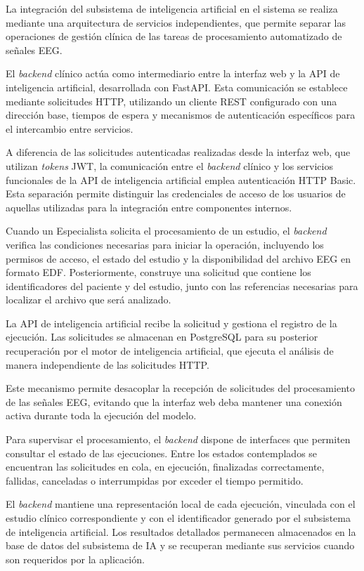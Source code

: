 La integración del subsistema de inteligencia artificial
en el sistema se realiza mediante una arquitectura de
servicios independientes, que permite separar las
operaciones de gestión clínica de las tareas de
procesamiento automatizado de señales EEG.

El \textit{backend} clínico actúa como intermediario entre
la interfaz web y la API de inteligencia artificial,
desarrollada con FastAPI. Esta comunicación se
establece mediante solicitudes HTTP, utilizando
un cliente REST configurado con una dirección base,
tiempos de espera y mecanismos de autenticación
específicos para el intercambio entre servicios.

A diferencia de las solicitudes autenticadas realizadas desde la interfaz web, que utilizan \textit{tokens} JWT, la comunicación entre el \textit{backend} clínico y los servicios funcionales de la API de inteligencia artificial emplea autenticación HTTP Basic. Esta separación permite distinguir las credenciales de acceso de los usuarios de aquellas utilizadas para la integración entre componentes internos.

Cuando un Especialista solicita el procesamiento
de un estudio, el \textit{backend} verifica las condiciones
necesarias para iniciar la operación, incluyendo
los permisos de acceso, el estado del estudio y
la disponibilidad del archivo EEG en formato EDF.
Posteriormente, construye una solicitud que contiene
los identificadores del paciente y del estudio,
junto con las referencias necesarias para localizar
el archivo que será analizado.

La API de inteligencia artificial recibe la solicitud
y gestiona el registro de la ejecución. Las solicitudes se almacenan en PostgreSQL para su
posterior recuperación por el motor de inteligencia
artificial, que ejecuta el análisis de manera
independiente de las solicitudes HTTP.

Este mecanismo permite desacoplar la recepción de
solicitudes del procesamiento de las señales EEG,
evitando que la interfaz web deba mantener una
conexión activa durante toda la ejecución del modelo.

Para supervisar el procesamiento, el \textit{backend} dispone
de interfaces que permiten consultar el estado de
las ejecuciones. Entre los estados contemplados se
encuentran las solicitudes en cola, en ejecución,
finalizadas correctamente, fallidas, canceladas o
interrumpidas por exceder el tiempo permitido.

El \textit{backend} mantiene una representación local de
cada ejecución, vinculada con el estudio clínico
correspondiente y con el identificador generado
por el subsistema de inteligencia artificial.
Los resultados detallados permanecen almacenados
en la base de datos del subsistema de IA y se
recuperan mediante sus servicios cuando son
requeridos por la aplicación.

